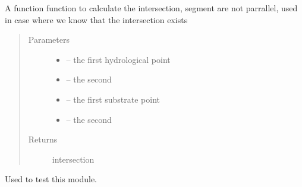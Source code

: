 \documentclass[letterpaper,10pt,english]{sphinxmanual}
\begin{document}
\begin{fulllineitems}
\label{\detokenize{index:src.mesh_grid2.intersec_cross}}
A function function to calculate the intersection, segment are not parrallel,
used in case where we know that the intersection exists
\begin{quote}\begin{description}
\item[{Parameters}] \leavevmode\begin{itemize}
\item {} 
 -- the first hydrological point

\item {} 
 -- the second

\item {} 
 -- the first substrate point

\item {} 
 -- the second

\end{itemize}

\item[{Returns}] \leavevmode
intersection

\end{description}\end{quote}

\end{fulllineitems}


\begin{fulllineitems}
\label{\detokenize{index:src.mesh_grid2.main}}
Used to test this module.

\end{fulllineitems}

\end{document}
